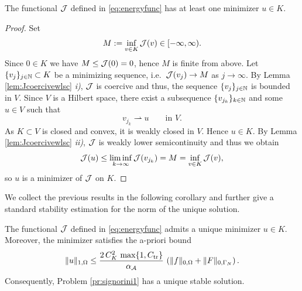 \begin{proposition}\label{pr:Jex}
	The functional ${\mathcal J}$ defined in \ref{eq:energyfunc} has at least one minimizer $u\in K$.
\end{proposition}
\begin{proof}
	Set
	\begin{equation*}
		M := \inf_{v\in K}{\mathcal J}(v)\in[-\infty,\infty).
	\end{equation*}
	Since $0\in K$ we have $M\le {\mathcal J}(0)=0$, hence $M$ is finite from above.
	Let $\{v_j\}_{j\in{\mathbb N}}\subset K$ be a minimizing sequence, i.e.\
	${\mathcal J}(v_j)\to M$ as $j\to\infty$. By Lemma \ref{lem:Jcoercivewlsc} {\em i)}, ${\mathcal J}$ is coercive and thus, the sequence $\{v_j\}_{j\in{\mathbb N}}$ is bounded in $V$. Since $V$ is a Hilbert space, there exist a subsequence $\{v_{j_k}\}_{k\in{\mathbb N}}$ and some $u\in V$ such that
	\begin{equation*}
		v_{j_k} \rightharpoonup u \qquad\text{in } V.
	\end{equation*}
	As $K\subset V$ is closed and convex, it is weakly closed in $V$. Hence $u\in K$. By Lemma \ref{lem:Jcoercivewlsc} {\em ii)}, ${\mathcal J}$ is weakly lower semicontinuity and thus we obtain
	\begin{equation*}
		{\mathcal J}(u)\le \liminf_{k\to\infty}{\mathcal J}(v_{j_k})=M=\inf_{v\in K}{\mathcal J}(v),
	\end{equation*}
	so $u$ is a minimizer of ${\mathcal J}$ on $K$.
\end{proof}
We collect the previous results in the following corollary and further give a standard stability estimation for the norm of the unique solution.
\begin{corollary}[Well-posedness of Problem \ref{pr:signorini1}]\label{cor:wellposed}
	The functional ${\mathcal J}$ defined in \ref{eq:energyfunc} admits a unique minimizer $u\in K$. Moreover, the minimizer satisfies the a-priori bound
	\begin{equation}\label{eq:ustab}
		\|u\|_{1,\Omega} \le \frac{2\,C_K^2\,\max\{1,C_\mathrm{tr}\}}{\alpha_{\mathcal A}}\,\left(\|f\|_{0,\Omega} +\|F\|_{0,\Gamma_N}\right).
	\end{equation}
	Consequently, Problem \ref{pr:signorini1} has a unique stable solution.
\end{corollary}
